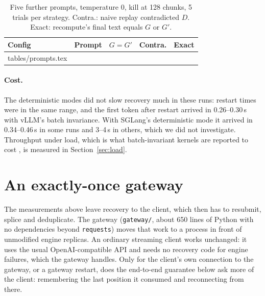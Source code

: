 \documentclass[10pt,twocolumn]{article}
\makeatletter
\def\PromptRows{\@@input tables/prompts.tex }
\makeatother
\begin{document}
\begin{table}[h]
\centering\small
\caption{Five further prompts, temperature 0, kill at 128 chunks, 5 trials
per strategy. Contra.: naive replay contradicted $D$. Exact: recompute's
final text equals $G$ or $G'$.}
\label{tab:prompts}
\begin{tabular}{@{}llccc@{}}
\toprule
Config & Prompt & $G{=}G'$ & Contra. & Exact \\
\midrule
\PromptRows
\bottomrule
\end{tabular}
\end{table}

\paragraph{Cost.} The deterministic modes did not slow recovery much in
these runs: restart times were in the same range, and the first token after
restart arrived in 0.26--0.30\,s with vLLM's batch invariance. With SGLang's
deterministic mode it arrived in 0.34--0.46\,s in some runs and 3--4\,s in
others, which we did not investigate. Throughput under load, which is what
batch-invariant kernels are reported to cost \cite{he2025nondeterminism}, is
measured in Section~\ref{sec:load}.

\section{An exactly-once gateway}
\label{sec:gateway}

The measurements above leave recovery to the client, which then has to
resubmit, splice and deduplicate. The gateway (\texttt{gateway/}, about 650
lines of Python with no dependencies beyond \texttt{requests}) moves that work
to a process in front of unmodified engine replicas. An ordinary streaming
client works unchanged: it uses the usual OpenAI-compatible API and needs no
recovery code for engine failures, which the gateway handles. Only for the
client's own connection to the gateway, or a gateway restart, does the
end-to-end guarantee below ask more of the client: remembering the last
position it consumed and reconnecting from there.
\end{document}
